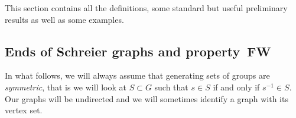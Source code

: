 \documentclass[a4paper]{article}
\theoremstyle{definition}
\newtheorem{defn}[lem]{Definition}
\theoremstyle{remark}
\DeclareMathOperator\Cayley{Cayl}
\DeclareMathOperator\Sch{Sch}
\DeclareMathOperator\stab{Stab}
\DeclarePairedDelimiter\abs{\lvert}{\rvert}
\newcommand{\setst}[2]{\{#1\ |\ #2\}}
\begin{document}
This section contains all the definitions, some standard but useful preliminary results as well as some examples.

\subsection{Ends of Schreier graphs and property~FW}
\label{Subsection:FW}
%
%
%
%
%
In what follows, we will always assume that generating sets of groups are \emph{symmetric}, that is we will look at $S\subset G$ such that $s\in S$ if and only if $s^{-1}\in S$.
Our graphs will be undirected and we will sometimes identify a graph with its vertex set.
%
%
%
%
%
%
\end{document}
